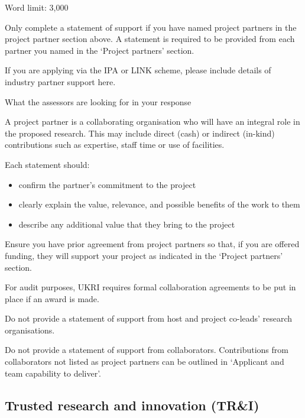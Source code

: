 \documentclass[12pt]{article}
\newenvironment{instruction}{\par\color{red}}{\par}
\begin{document}
\begin{instruction}

Word limit: 3,000

Only complete a statement of support if you have named project partners in the
project partner section above. A statement is required to be provided from each
partner you named in the ‘Project partners’ section.

If you are applying via the IPA or LINK scheme, please include details of
industry partner support here.

What the assessors are looking for in your response

A project partner is a collaborating organisation who will have an integral
role in
the proposed research. This may include direct (cash) or indirect (in-kind)
contributions such as expertise, staff time or use of facilities.

Each statement should:

\begin{itemize}

    \item confirm the partner’s commitment to the project

    \item clearly explain the value, relevance, and possible benefits of the
    work to them

    \item describe any additional value that they bring to the project

\end{itemize}

Ensure you have prior agreement from project partners so that, if you are
offered funding, they will support your project as indicated in the ‘Project
partners’ section.

For audit purposes, UKRI requires formal collaboration agreements to be put in
place if an award is made.

Do not provide a statement of support from host and project co-leads’ research
organisations.

Do not provide a statement of support from collaborators. Contributions from
collaborators not listed as project partners can be outlined in ‘Applicant and
team capability to deliver’.

\end{instruction}
% 

\pagebreak
\subsection{Trusted research and innovation (TR\&I)}
\end{document}
